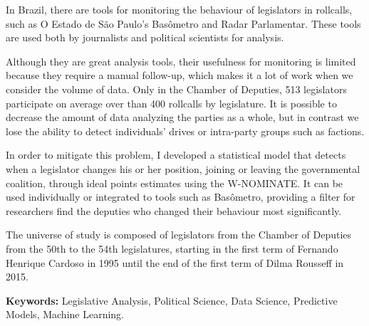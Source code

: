 In Brazil, there are tools for monitoring the behaviour of legislators in
rollcalls, such as O Estado de São Paulo's Basômetro and Radar Parlamentar.
These tools are used both by journalists and political scientists for analysis.

Although they are great analysis tools, their usefulness for monitoring is
limited because they require a manual follow-up, which makes it a lot of work
when we consider the volume of data. Only in the Chamber of Deputies, 513
legislators participate on average over than 400 rollcalls by legislature. It
is possible to decrease the amount of data analyzing the parties as a whole,
but in contrast we lose the ability to detect individuals' drives or
intra-party groups such as factions.

In order to mitigate this problem, I developed a statistical model that detects
when a legislator changes his or her position, joining or leaving the
governmental coalition, through ideal points estimates using the W-NOMINATE. It
can be used individually or integrated to tools such as Basômetro, providing a
filter for researchers find the deputies who changed their behaviour most
significantly.

The universe of study is composed of legislators from the Chamber of Deputies
from the 50th to the 54th legislatures, starting in the first term of Fernando
Henrique Cardoso in 1995 until the end of the first term of Dilma Rousseff in
2015.

\textbf{Keywords:} Legislative Analysis, Political Science, Data Science,
Predictive Models, Machine Learning.
